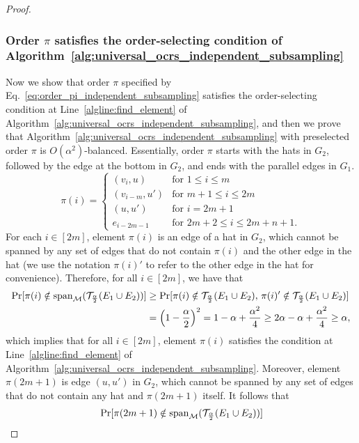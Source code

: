 \documentclass[11pt]{article}
\newcommand{\M}{{\mathcal M}}
\newcommand{\T}{{\mathcal T}}
\newcommand{\spa}{\textnormal{span}}
\begin{document}
\begin{proof}
\subsubsection*{Order $\pi$ satisfies the order-selecting condition of Algorithm~\ref{alg:universal_ocrs_independent_subsampling}}
Now we show that order $\pi$ specified by Eq.~\eqref{eq:order_pi_independent_subsampling} satisfies the order-selecting condition at Line~\ref{algline:find_element} of Algorithm~\ref{alg:universal_ocrs_independent_subsampling}, and then we prove that Algorithm~\ref{alg:universal_ocrs_independent_subsampling} with preselected order $\pi$ is $O(\alpha^2)$-balanced. Essentially, order $\pi$ starts with the hats in $G_2$, followed by the edge at the bottom in $G_2$, and ends with the parallel edges in $G_1$.
\begin{equation}\label{eq:order_pi_independent_subsampling}
    \pi(i)=
    \begin{cases}
        (v_{i},u) &\textrm{for } 1\le i\le m\\
        (v_{i-m},u') &\textrm{for } m+1\le i\le 2m\\
        (u,u') &\textrm{for } i=2m+1\\
        e_{i-2m-1} &\textrm{for } 2m+2\le i\le 2m+n+1.
    \end{cases}
\end{equation}
For each $i\in[2m]$, element $\pi(i)$ is an edge of a hat in $G_2$, which cannot be spanned by any set of edges that do not contain $\pi(i)$ and the other edge in the hat (we use the notation $\pi(i)'$ to refer to the other edge in the hat for convenience). Therefore, for all $i\in[2m]$, we have that
\begin{align*}
\Pr[\pi(i)\notin\spa_{\M}(\T_{\frac{\alpha}{2}}(E_1\cup E_2))]&\ge\Pr[\pi(i)\notin\T_{\frac{\alpha}{2}}(E_1\cup E_2),\,\pi(i)'\notin\T_{\frac{\alpha}{2}}(E_1\cup E_2)]\\
&=\left(1-\frac{\alpha}{2}\right)^2=1-\alpha+\frac{\alpha^2}{4}\ge2\alpha-\alpha+\frac{\alpha^2}{4}\ge\alpha,
\end{align*}
which implies that for all $i\in[2m]$, element $\pi(i)$ satisfies the condition at Line~\ref{algline:find_element} of Algorithm~\ref{alg:universal_ocrs_independent_subsampling}. Moreover, element $\pi(2m+1)$ is edge $(u,u')$ in $G_2$, which cannot be spanned by any set of edges that do not contain any hat and $\pi(2m+1)$ itself. It follows that
\begin{align*}
    &\Pr[\pi(2m+1)\notin\spa_{\M}(\T_{\frac{\alpha}{2}}(E_1\cup E_2))]\\

\end{align*}
\end{proof}
\end{document}
